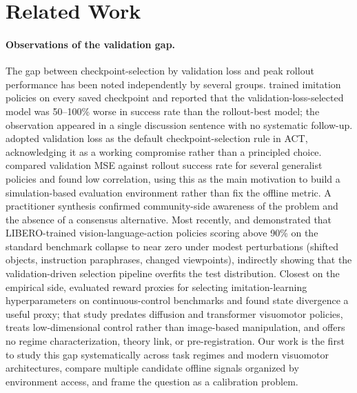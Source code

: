 
\section{Related Work}

\paragraph{Observations of the validation gap.}
The gap between checkpoint-selection by validation loss and peak rollout performance has
been noted independently by several groups. \citet{mandlekar2021} trained imitation
policies on every saved checkpoint and reported that the validation-loss-selected model was
50--100\% worse in success rate than the rollout-best model; the observation appeared in a
single discussion sentence with no systematic follow-up. \citet{zhao2023act} adopted
validation loss as the default checkpoint-selection rule in ACT, acknowledging it as a
working compromise rather than a principled choice. \citet{li2024simpler} compared
validation MSE against rollout success rate for several generalist policies and found low
correlation, using this as the main motivation to build a simulation-based evaluation
environment rather than fix the offline metric. A practitioner synthesis \citep{marchand2024}
confirmed community-side awareness of the problem and the absence of a consensus
alternative. Most recently, \citet{liu2025liberopro} and \citet{lee2025liberoplus}
demonstrated that LIBERO-trained vision-language-action policies scoring above 90\% on the
standard benchmark collapse to near zero under modest perturbations (shifted objects,
instruction paraphrases, changed viewpoints), indirectly showing that the validation-driven
selection pipeline overfits the test distribution. Closest on the empirical side,
\citet{hpil2021} evaluated reward proxies for selecting imitation-learning hyperparameters on
continuous-control benchmarks and found state divergence a useful proxy; that study predates
diffusion and transformer visuomotor policies, treats low-dimensional control rather than
image-based manipulation, and offers no regime characterization, theory link, or pre-registration.
Our work is the first to study this gap systematically across task regimes and modern visuomotor
architectures, compare multiple candidate offline signals organized by environment access, and
frame the question as a calibration problem.

